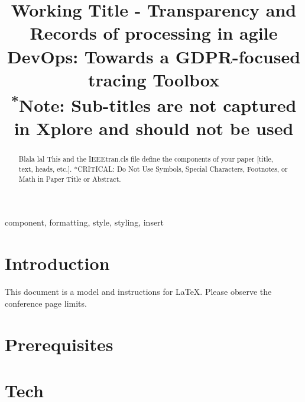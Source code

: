 \documentclass[conference]{IEEEtran}
\begin{document}
\title{Working Title - Transparency and Records of processing in agile DevOps:
Towards a GDPR-focused tracing Toolbox\\
{\footnotesize \textsuperscript{*}Note: Sub-titles are not captured in Xplore and
should not be used}
}

\author{
\and
\and
}

\maketitle





\begin{abstract}
Blala lal This and the IEEEtran.cls file define the components of your paper [title, text, heads, etc.]. *CRITICAL: Do Not Use Symbols, Special Characters, Footnotes, 
or Math in Paper Title or Abstract.
\end{abstract}

\begin{IEEEkeywords}
component, formatting, style, styling, insert
\end{IEEEkeywords}

\section{Introduction}
This document is a model and instructions for \LaTeX.
Please observe the conference page limits. 

\section{Prerequisites}



\section{Tech}




\printglossaries



\end{document}
